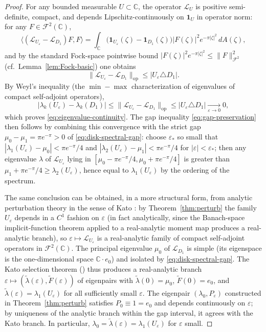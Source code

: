 \documentclass[a4paper,11pt,reqno]{amsart}
\numberwithin{equation}{section}
\theoremstyle{plain} %
\theoremstyle{definition} %
\theoremstyle{remark}
\newcommand{\C}{\mathbb{C}}
\begin{document}
\begin{proof}
For any bounded measurable \(U\subset \C\), the operator \(\mathcal L_U\) is
positive semi-definite, compact, and depends Lipschitz-continuously on
\(\mathbf 1_U\) in operator norm: for any \(F\in \mathcal F^2(\C)\),
\[
\langle (\mathcal L_{U_\varepsilon}-\mathcal L_{D_1})F,F\rangle
=
\int_\C \bigl(\mathbf 1_{U_\varepsilon}(\zeta)
-\mathbf 1_{D_1}(\zeta)\bigr)|F(\zeta)|^2 e^{-\pi|\zeta|^2}\,dA(\zeta),
\]
and by the standard Fock-space pointwise bound
\(|F(\zeta)|^2 e^{-\pi|\zeta|^2}\le \|F\|_{\mathcal F^2}^2\) (cf.\
Lemma~\ref{lem:Fock-basic}) one obtains
\[
\|\mathcal L_{U_\varepsilon}-\mathcal L_{D_1}\|_{\mathrm{op}}
\le
|U_\varepsilon\triangle D_1|.
\]
By Weyl's inequality (the \(\min\!-\!\max\) characterization of eigenvalues
of compact self-adjoint operators),
\[
|\lambda_k(U_\varepsilon)-\lambda_k(D_1)|
\le
\|\mathcal L_{U_\varepsilon}-\mathcal L_{D_1}\|_{\mathrm{op}}
\le
|U_\varepsilon\triangle D_1|
\xrightarrow[\varepsilon\to 0]{}0,
\]
which proves \eqref{eq:eigenvalue-continuity}. The gap inequality
\eqref{eq:gap-preservation} then follows by combining this convergence with
the strict gap \(\mu_0-\mu_1=\pi e^{-\pi}>0\) of
\eqref{eq:disk-spectral-gap}: choose \(\varepsilon_*\) so small that
\(|\lambda_1(U_\varepsilon)-\mu_0|<\pi e^{-\pi}/4\) and
\(|\lambda_2(U_\varepsilon)-\mu_1|<\pi e^{-\pi}/4\) for
\(|\varepsilon|<\varepsilon_*\); then any eigenvalue \(\lambda\) of
\(\mathcal L_{U_\varepsilon}\) lying in
\([\mu_0-\pi e^{-\pi}/4,\mu_0+\pi e^{-\pi}/4]\) is greater than
\(\mu_1+\pi e^{-\pi}/4\ge \lambda_2(U_\varepsilon)\), hence equal to
\(\lambda_1(U_\varepsilon)\) by the ordering of the spectrum.

The same conclusion can be obtained, in a more structural form, from analytic
perturbation theory in the sense of Kato \cite{Kato}: by Theorem~\ref{thm:perturb}
the family \(U_\varepsilon\) depends in a \(C^1\) fashion on \(\varepsilon\)
(in fact analytically, since the Banach-space implicit-function theorem
applied to a real-analytic moment map produces a real-analytic branch), so
\(\varepsilon\mapsto \mathcal L_{U_\varepsilon}\) is a real-analytic family
of compact self-adjoint operators in \(\mathcal F^2(\C)\). The principal
eigenvalue \(\mu_0\) of \(\mathcal L_{D_1}\) is simple (its eigenspace is the
one-dimensional space \(\C\cdot e_0\)) and isolated by
\eqref{eq:disk-spectral-gap}. The Kato selection theorem
(\cite[Ch.~VII, Thm.~1.8]{Kato}) thus produces a real-analytic branch
\(\varepsilon\mapsto (\widetilde\lambda(\varepsilon),
\widetilde F(\varepsilon))\) of eigenpairs with
\(\widetilde\lambda(0)=\mu_0\), \(\widetilde F(0)=e_0\), and
\(\widetilde\lambda(\varepsilon)=\lambda_1(U_\varepsilon)\) for all
sufficiently small \(\varepsilon\). The eigenpair \((\lambda_0,P_\varepsilon)\)
constructed in Theorem~\ref{thm:perturb} satisfies \(P_0\equiv 1=e_0\) and
depends continuously on \(\varepsilon\); by uniqueness of the analytic branch
within the gap interval, it agrees with the Kato branch. In particular,
\(\lambda_0=\widetilde\lambda(\varepsilon)=\lambda_1(U_\varepsilon)\) for
\(\varepsilon\) small.
\end{proof}
\end{document}
